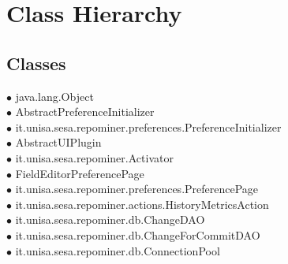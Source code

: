\section*{Class Hierarchy}{
\thispagestyle{empty}
\subsection*{Classes}
{\raggedright
\hspace{0.0cm} $\bullet$ java.lang.Object {\tiny {}} \\
\hspace{1.0cm} $\bullet$ AbstractPreferenceInitializer {\tiny } \\
\hspace{2.0cm} $\bullet$ it.unisa.sesa.repominer.preferences.PreferenceInitializer {\tiny {}} \\
\hspace{1.0cm} $\bullet$ AbstractUIPlugin {\tiny } \\
\hspace{2.0cm} $\bullet$ it.unisa.sesa.repominer.Activator {\tiny {}} \\
\hspace{1.0cm} $\bullet$ FieldEditorPreferencePage {\tiny } \\
\hspace{2.0cm} $\bullet$ it.unisa.sesa.repominer.preferences.PreferencePage {\tiny {}} \\
\hspace{1.0cm} $\bullet$ it.unisa.sesa.repominer.actions.HistoryMetricsAction {\tiny {}} \\
\hspace{1.0cm} $\bullet$ it.unisa.sesa.repominer.db.ChangeDAO {\tiny {}} \\
\hspace{1.0cm} $\bullet$ it.unisa.sesa.repominer.db.ChangeForCommitDAO {\tiny {}} \\
\hspace{1.0cm} $\bullet$ it.unisa.sesa.repominer.db.ConnectionPool {\tiny {}} \\
}}
